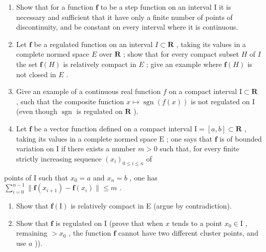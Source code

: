 \begin{enumerate}
\def\labelenumi{\arabic{enumi})}
\setcounter{enumi}{1}
\item
  Show that for a function \(\mathbf{f}\) to be a step function on an interval I it is necessary and sufficient that it have only a finite number of points of discontinuity, and be constant on every interval where it is continuous.
\item
  Let \(\mathbf{f}\) be a regulated function on an interval \(I \subset \mathbf{R}\) , taking its values in a complete normed space \(E\) over \(\mathbf{R}\) ; show that for every compact subset \(H\) of \(I\) the set \(\mathbf{f}(H)\) is relatively compact in \(E\) ; give an example where \(\mathbf{f}(H)\) is not closed in \(E\) .
\item
  Give an example of a continuous real function \(f\) on a compact interval \(\mathrm{I} \subset \mathbf{R}\) , such that the composite function \(x \mapsto \operatorname{sgn}(f(x))\) is not regulated on \(\mathrm{I}\) (even though \(\operatorname{sgn}\) is regulated on \(\mathbf{R}\) ).
\item
  Let \(\mathbf{f}\) be a vector function defined on a compact interval \(\mathrm{I} = [a, b] \subset \mathbf{R}\) , taking its values in a complete normed space \(\mathrm{E}\) ; one says that \(\mathbf{f}\) is of bounded variation on \(\mathrm{I}\) if there exists a number \(m > 0\) such that, for every finite strictly increasing sequence \((x_i)_{0 \leqslant i \leqslant n}\) of
\end{enumerate}

points of I such that \(x_0 = a\) and \(x_n = b\) , one has \(\sum_{i=0}^{n-1} \| \mathbf{f}(x_{i+1}) - \mathbf{f}(x_i) \| \leqslant m\) .

\begin{enumerate}
\def\labelenumi{\alph{enumi})}
\item
  Show that \(\mathbf{f}(\mathrm{I})\) is relatively compact in E (argue by contradiction).
\item
  Show that \(\mathbf{f}\) is regulated on I (prove that when \(x\) tends to a point \(x_0 \in \mathrm{I}\) , remaining \(>x_0\) , the function \(\mathbf{f}\) cannot have two different cluster points, and use \(a\) )).
\end{enumerate}

